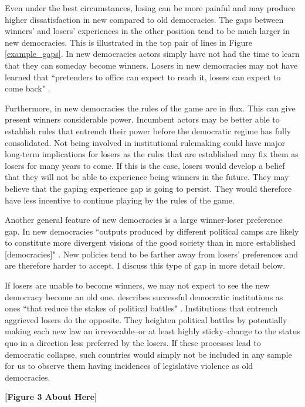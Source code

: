 \documentclass[a4paper]{article}\usepackage{graphicx, color}
\begin{document}
Even under the best circumstances, losing can be more painful and may produce higher dissatisfaction in new compared to old democracies. The gaps between winners' and losers' experiences in the other position tend to be much larger in new democracies. This is illustrated in the top pair of lines in Figure \ref{example_gaps}. In new democracies actors simply have not had the time to learn that they can someday become winners. Losers in new democracies may not have learned that ``pretenders to office can expect to reach it, losers can expect to come back" \citep[][36]{Przeworski1991}.

Furthermore, in new democracies the rules of the game are in flux. This can give present winners considerable power. Incumbent actors may be better able to establish rules that entrench their power before the democratic regime has fully consolidated. Not being involved in institutional rulemaking could have major long-term implications for losers as the rules that are established may fix them as losers for many years to come. If this is the case, losers would develop a belief that they will not be able to experience being winners in the future. They may believe that the gaping experience gap is going to persist. They would therefore have less incentive to continue playing by the rules of the game. 

Another general feature of new democracies is a large winner-loser preference gap. In new democracies ``outputs produced by different political camps are likely to constitute more divergent visions of the good society than in more established [democracies]" \citep[][92]{Anderson2005}. New policies tend to be farther away from losers' preferences and are therefore harder to accept. I discuss this type of gap in more detail below.

If losers are unable to become winners, we may not expect to see the new democracy become an old one. \citeauthor{Przeworski1991} describes successful democratic institutions as ones ``that reduce the stakes of political battles" \citeyearpar[][36]{Przeworski1991}. Institutions that entrench aggrieved losers do the opposite. They heighten political battles by potentially making each new law an irrevocable--or at least highly sticky--change to the status quo in a direction less preferred by the losers. If these processes lead to democratic collapse, such countries would simply not be included in any sample for us to observe them having incidences of legislative violence as old democracies. 

\begin{center}

    {\bf{[Figure 3 About Here]}}

\end{center}
\end{document}
